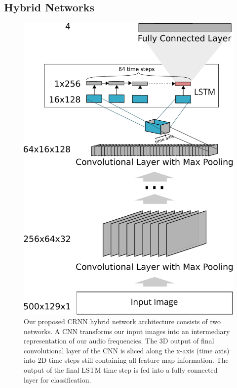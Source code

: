 \subsection{Hybrid Networks}
\label{sec:hybrid_networks}

	\begin{figure}[]
  		\centering
    	\includegraphics[width=\textwidth, keepaspectratio]{img/crnn.pdf}
    	\caption{Our proposed CRNN hybrid network architecture consists of two networks. A CNN transforms our input images into an intermediary representation of our audio frequencies. The 3D output of final convolutional layer of the CNN is sliced along the x-axis (time axis) into 2D time steps still containing all feature map information. The output of the final LSTM time step is fed into a fully connected layer for classification.}
    	\label{fig:crnn}
	\end{figure}
	

